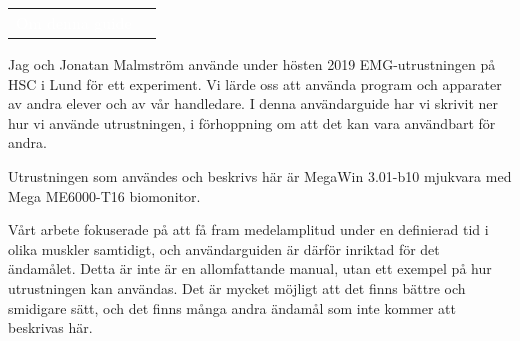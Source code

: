 \documentclass[10pt,a4paper]{article}
\newcommand{\pagetitle}[2] {
	\begin{tabularx}{\linewidth}{>{\columncolor{darkpurple}}c >{\columncolor{lightpurple!35}}X}
		\LARGE \textcolor{white}{{#1}} & \LARGE {#2} \\[3pt]
	\end{tabularx}
}
\begin{document}
\restoregeometry
\newpage


\pagetitle{Om denna guide}{}\par
\vspace{1em}
Jag och Jonatan Malmström använde under hösten 2019 EMG-utrustningen på HSC i Lund för ett experiment. Vi lärde oss att använda program och apparater av andra elever och av vår handledare. I denna användarguide har vi skrivit ner hur vi använde utrustningen, i förhoppning om att det kan vara användbart för andra.

Utrustningen som användes och beskrivs här är MegaWin 3.01-b10 mjukvara med Mega ME6000-T16 biomonitor.  

Vårt arbete fokuserade på att få fram medelamplitud under en definierad tid i olika muskler samtidigt, och användarguiden är därför inriktad för det ändamålet. Detta är inte är en allomfattande manual, utan ett exempel på hur utrustningen kan användas. Det är mycket möjligt att det finns bättre och smidigare sätt, och det finns många andra ändamål som inte kommer att beskrivas här.
\end{document}
